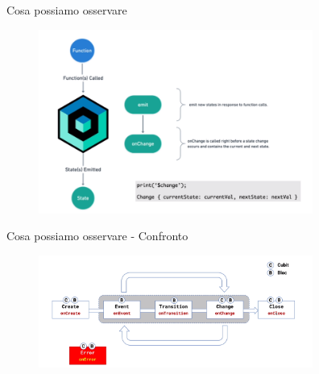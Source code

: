 \documentclass{../libs/presentation_format}
\begin{document}

\begin{frame}{Cosa possiamo osservare}
	\begin{figure}[htpb]
		\centering
		\includegraphics[width=9cm]{../libs/cubit-flow}
	\end{figure}
\end{frame}


\begin{frame}{Cosa possiamo osservare - Confronto}
	\begin{figure}[htpb]
		\centering
		\includegraphics[width=9cm]{../libs/bloc-events}
	\end{figure}
\end{frame}

\end{document}
